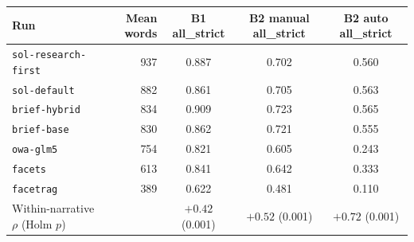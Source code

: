 \begin{tabular}{@{}lrccc@{}}
\toprule
Run & Mean words & B1 all\_strict & B2 manual all\_strict & B2 auto all\_strict \\
\midrule
\texttt{sol-research-first} & 937 & 0.887 & 0.702 & 0.560 \\
\texttt{sol-default} & 882 & 0.861 & 0.705 & 0.563 \\
\texttt{brief-hybrid} & 834 & 0.909 & 0.723 & 0.565 \\
\texttt{brief-base} & 830 & 0.862 & 0.721 & 0.555 \\
\texttt{owa-glm5} & 754 & 0.821 & 0.605 & 0.243 \\
\texttt{facets} & 613 & 0.841 & 0.642 & 0.333 \\
\texttt{facetrag} & 389 & 0.622 & 0.481 & 0.110 \\
\midrule
Within-narrative $\rho$ (Holm $p$) & & $+0.42$ (0.001) & $+0.52$ (0.001) & $+0.72$ (0.001) \\
\bottomrule
\end{tabular}
